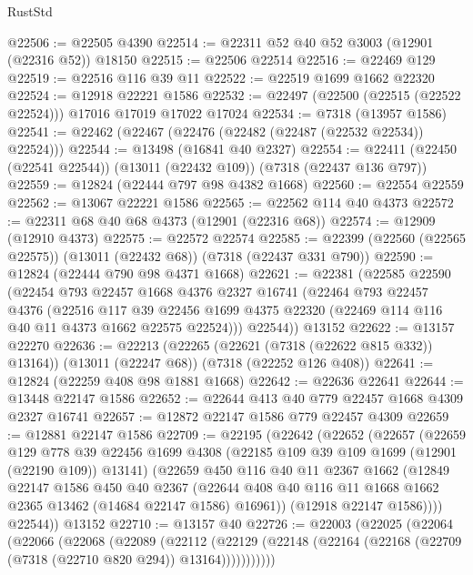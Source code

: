 \begin{lexlean}{RustStd}
\begin{coremodule}
@22506 := @22505 @4390
@22514 := @22311 @52 @40 @52 @3003 (@12901 (@22316 @52)) @18150
@22515 := @22506 @22514
@22516 := @22469 @129
@22519 := @22516 @116 @39 @11
@22522 := @22519 @1699 @1662 @22320
@22524 := @12918 @22221 @1586
@22532 := @22497 (@22500 (@22515 (@22522 @22524))) @17016 @17019 @17022 @17024
@22534 := @7318 (@13957 @1586)
@22541 := @22462 (@22467 (@22476 (@22482 (@22487 (@22532 @22534)) @22524)))
@22544 := @13498 (@16841 @40 @2327)
@22554 := @22411 (@22450 (@22541 @22544)) (@13011 (@22432 @109)) (@7318 (@22437 @136 @797))
@22559 := @12824 (@22444 @797 @98 @4382 @1668)
@22560 := @22554 @22559
@22562 := @13067 @22221 @1586
@22565 := @22562 @114 @40 @4373
@22572 := @22311 @68 @40 @68 @4373 (@12901 (@22316 @68))
@22574 := @12909 (@12910 @4373)
@22575 := @22572 @22574
@22585 := @22399 (@22560 (@22565 @22575)) (@13011 (@22432 @68)) (@7318 (@22437 @331 @790))
@22590 := @12824 (@22444 @790 @98 @4371 @1668)
@22621 := @22381
    (@22585
      @22590
      (@22454
        @793
        @22457
        @1668
        @4376
        @2327
        @16741
        (@22464
          @793
          @22457
          @4376
          (@22516
            @117
            @39
            @22456
            @1699
            @4375
            @22320
            (@22469 @114 @116 @40 @11 @4373 @1662 @22575 @22524)))
        @22544))
    @13152
@22622 := @13157 @22270
@22636 := @22213
    (@22265 (@22621 (@7318 (@22622 @815 @332)) @13164))
    (@13011 (@22247 @68))
    (@7318 (@22252 @126 @408))
@22641 := @12824 (@22259 @408 @98 @1881 @1668)
@22642 := @22636 @22641
@22644 := @13448 @22147 @1586
@22652 := @22644 @413 @40 @779 @22457 @1668 @4309 @2327 @16741
@22657 := @12872 @22147 @1586 @779 @22457 @4309
@22659 := @12881 @22147 @1586
@22709 := @22195
    (@22642
      (@22652
        (@22657
          (@22659
            @129
            @778
            @39
            @22456
            @1699
            @4308
            (@22185 @109 @39 @109 @1699 (@12901 (@22190 @109)) @13141)
            (@22659
              @450
              @116
              @40
              @11
              @2367
              @1662
              (@12849
                @22147
                @1586
                @450
                @40
                @2367
                (@22644 @408 @40 @116 @11 @1668 @1662 @2365 @13462 (@14684 @22147 @1586) @16961))
              (@12918 @22147 @1586))))
        @22544))
    @13152
@22710 := @13157 @40
@22726 := @22003
    (@22025
      (@22064
        (@22066
          (@22068
            (@22089
              (@22112
                (@22129 (@22148 (@22164 (@22168 (@22709 (@7318 (@22710 @820 @294)) @13164)))))))))))

\end{coremodule}
\end{lexlean}
